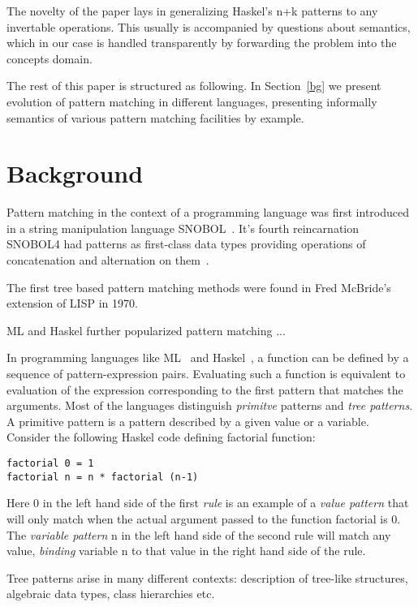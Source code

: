 \documentclass[submission,copyright]{eptcs}
\begin{document}
The novelty of the paper lays in generalizing Haskel's n+k patterns to any 
invertable operations. This usually is accompanied by questions about semantics, 
which in our case is handled transparently by forwarding the problem into the 
concepts domain.

The rest of this paper is structured as following. In Section~\ref{bg} we 
present evolution of pattern matching in different languages, presenting 
informally semantics of various pattern matching facilities by example.

\section{Background} %
\label{sec:bg}

Pattern matching in the context of a programming language was first introduced 
in a string manipulation language SNOBOL~\cite{SNOBOL64}. It's fourth 
reincarnation SNOBOL4 had patterns as first-class data types providing 
operations of concatenation and alternation on them~\cite{SNOBOL71}.

The first tree based pattern matching methods were found in Fred McBride's 
extension of LISP in 1970.

ML and Haskel further popularized pattern matching ...

In programming languages like ML~\cite{ML90} and Haskel~\cite{Haskell98Book}, a 
function can be defined by a sequence of pattern-expression pairs. Evaluating 
such a function is equivalent to evaluation of the expression corresponding to 
the first pattern that matches the arguments. Most of the languages distinguish 
\emph{primitve} patterns and \emph{tree patterns}. A primitive pattern is a 
pattern described by a given value or a variable. Consider the following Haskel 
code defining factorial function: 

\begin{lstlisting}
factorial 0 = 1
factorial n = n * factorial (n-1)
\end{lstlisting}

Here 0 in the left hand side of the first \emph{rule} is an example of a 
\emph{value pattern} that will only match when the actual argument passed to the 
function factorial is 0. The \emph{variable pattern} n in the left hand side of 
the second rule will match any value, \emph{binding} variable n to that value in 
the right hand side of the rule.

Tree patterns arise in many different contexts: description of tree-like 
structures, algebraic data types, class hierarchies etc.
\end{document}
